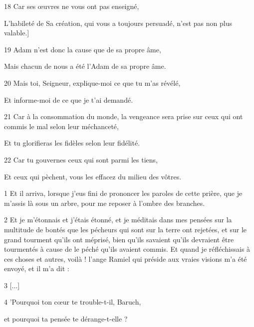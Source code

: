 \par 18 Car ses œuvres ne vous ont pas enseigné,

\par L'habileté de Sa création, qui vous a toujours persuadé, n'est pas non plus valable.]

\par 19 Adam n'est donc la cause que de sa propre âme,

\par Mais chacun de nous a été l'Adam de sa propre âme.

\par 20 Mais toi, Seigneur, explique-moi ce que tu m'as révélé,

\par Et informe-moi de ce que je t'ai demandé.

\par 21 Car à la consommation du monde, la vengeance sera prise sur ceux qui ont commis le mal selon leur méchanceté,

\par Et tu glorifieras les fidèles selon leur fidélité.

\par 22 Car tu gouvernes ceux qui sont parmi les tiens,

\par Et ceux qui pèchent, vous les effacez du milieu des vôtres.


\par 1 Et il arriva, lorsque j'eus fini de prononcer les paroles de cette prière, que je m'assis là sous un arbre, pour me reposer à l'ombre des branches.

\par 2 Et je m'étonnais et j'étais étonné, et je méditais dans mes pensées sur la multitude de bontés que les pécheurs qui sont sur la terre ont rejetées, et sur le grand tourment qu'ils ont méprisé, bien qu'ils savaient qu'ils devraient être tourmentés à cause de le péché qu'ils avaient commis. Et quand je réfléchissais à ces choses et autres, voilà ! l'ange Ramiel qui préside aux vraies visions m'a été envoyé, et il m'a dit :

\par 3 [...]

\par 4 'Pourquoi ton cœur te trouble-t-il, Baruch,

\par et pourquoi ta pensée te dérange-t-elle ?

